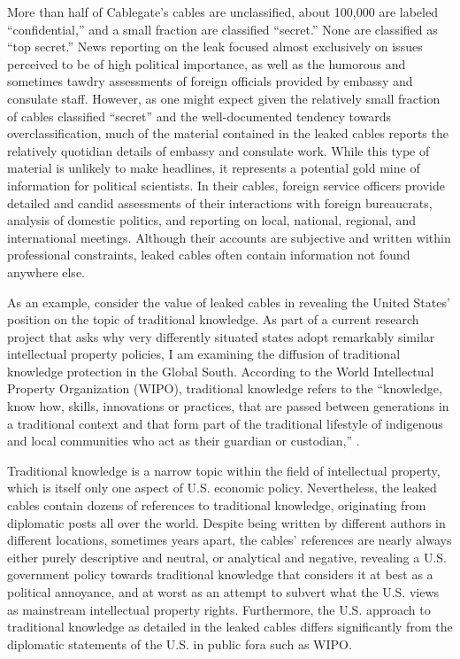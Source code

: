 \documentclass[12pt]{article}
\begin{document}
More than half of Cablegate's cables are unclassified, about 100,000 are labeled ``confidential,'' 
and a small 
fraction are classified ``secret.'' None are classified as ``top secret.'' News reporting on the leak 
focused almost exclusively on issues perceived to be of high political importance, as well as 
the humorous and sometimes tawdry assessments of foreign officials provided by embassy and consulate 
staff. However, as one might expect given the relatively small fraction of cables classified ``secret'' 
and 
the well-documented tendency towards overclassification, much of the material 
contained in the leaked cables reports the relatively quotidian details of embassy and consulate 
work. 
While this type of material is unlikely to make headlines, it represents a potential gold mine 
of information for political scientists. In their cables, foreign service officers provide detailed 
and candid assessments of their interactions with foreign bureaucrats, analysis of domestic politics, 
and reporting on local, national, regional, and international meetings. Although their accounts are 
subjective and written within professional constraints, leaked cables often contain information 
not found anywhere else.

As an example, consider the value of leaked cables in revealing the United States' 
position on the topic of traditional knowledge. As part of a current research project that asks why 
very differently situated states 
adopt remarkably similar intellectual property policies, I am examining the diffusion of traditional 
knowledge protection in the Global South. According to the World Intellectual Property Organization 
(WIPO), traditional knowledge refers to the ``knowledge, know how, 
skills, innovations or practices, that are passed between generations in a traditional context and 
that form part of the traditional lifestyle of indigenous and local communities who act as their 
guardian or custodian,'' \citep{world_intellectual_property_organization2013traditional}.

Traditional knowledge is a narrow topic within the field of intellectual property, which is itself 
only one aspect of U.S. economic policy. Nevertheless, the leaked cables contain dozens of references 
to traditional knowledge, originating from diplomatic posts all over the world. Despite being written 
by different authors in different locations, sometimes years apart, the cables' references are nearly 
always either purely descriptive and neutral, or analytical and negative, revealing a U.S. government 
policy towards traditional knowledge that considers it at best as a political annoyance, and at worst as 
an attempt to subvert what the U.S. views as mainstream intellectual property rights. Furthermore, the U.S. 
approach to traditional knowledge as detailed in the leaked cables differs significantly from the 
diplomatic statements of the U.S. in public fora such as WIPO.
\end{document}
